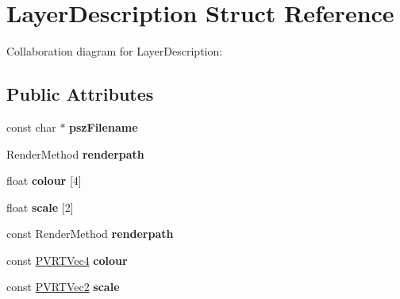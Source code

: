 \hypertarget{struct_layer_description}{\section{Layer\+Description Struct Reference}
\label{struct_layer_description}
}


Collaboration diagram for Layer\+Description\+:
\subsection*{Public Attributes}
\begin{DoxyCompactItemize}
\item 
\hypertarget{struct_layer_description_ac0877613d16792e5259f9e0ae8ee0dc5}{const char $\ast$ {\bfseries psz\+Filename}}\label{struct_layer_description_ac0877613d16792e5259f9e0ae8ee0dc5}

\item 
\hypertarget{struct_layer_description_a435b6084d937d78d64ad7fb0204d85c2}{Render\+Method {\bfseries renderpath}}\label{struct_layer_description_a435b6084d937d78d64ad7fb0204d85c2}

\item 
\hypertarget{struct_layer_description_a5a6fe0e88fd4b27e4a744d4ac828e8bd}{float {\bfseries colour} \mbox{[}4\mbox{]}}\label{struct_layer_description_a5a6fe0e88fd4b27e4a744d4ac828e8bd}

\item 
\hypertarget{struct_layer_description_abab0564622df1b85947d680404725e77}{float {\bfseries scale} \mbox{[}2\mbox{]}}\label{struct_layer_description_abab0564622df1b85947d680404725e77}

\item 
\hypertarget{struct_layer_description_a435b6084d937d78d64ad7fb0204d85c2}{const Render\+Method {\bfseries renderpath}}\label{struct_layer_description_a435b6084d937d78d64ad7fb0204d85c2}

\item 
\hypertarget{struct_layer_description_ab15adf4c5a6d49aa2c306856a9293dda}{const \hyperlink{struct_p_v_r_t_vec4}{P\+V\+R\+T\+Vec4} {\bfseries colour}}\label{struct_layer_description_ab15adf4c5a6d49aa2c306856a9293dda}

\item 
\hypertarget{struct_layer_description_a3833853fba106bb4037841067ef842b9}{const \hyperlink{struct_p_v_r_t_vec2}{P\+V\+R\+T\+Vec2} {\bfseries scale}}\label{struct_layer_description_a3833853fba106bb4037841067ef842b9}

\end{DoxyCompactItemize}



